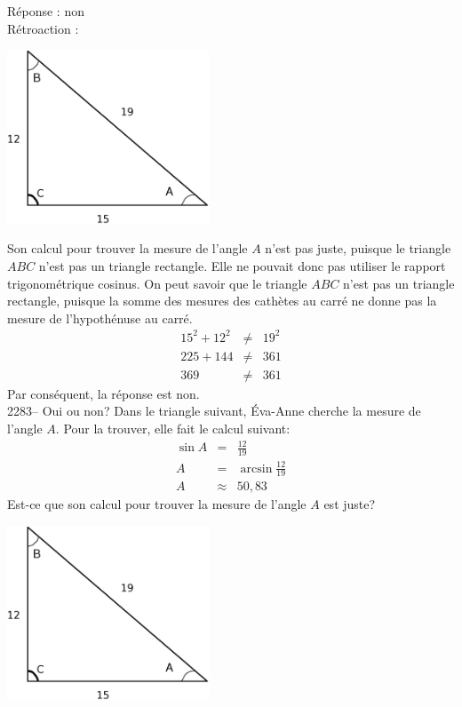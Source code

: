 \documentclass[letterpaper, 12pt]{article}
\begin{document}
R\'eponse : non\\

R\'etroaction :\\
\begin{center}
 \includegraphics[width=6cm,bb=14 14 607 535]{Triangle_rectangle2282.eps}
\end{center}
Son calcul pour trouver la mesure de l'angle $A$ n'est pas juste, puisque le triangle $ABC$ n'est pas un triangle rectangle. Elle ne pouvait donc pas utiliser le rapport trigonom\'etrique cosinus. On peut savoir que le triangle $ABC$ n'est pas un triangle rectangle, puisque la somme des mesures des cath\`etes au carr\'e ne donne pas la mesure de l'hypoth\'enuse au carr\'e.
\begin{eqnarray*}
15^{2}+12^{2}&\neq&19^{2}\\
225+144&\neq&361\\
369&\neq&361
\end{eqnarray*}
Par cons\'equent, la r\'eponse est non.\\

2283-- Oui ou non? Dans le triangle suivant, \'Eva-Anne cherche la mesure de l'angle $A$. Pour la trouver, elle fait le calcul suivant:
\begin{eqnarray*}
\sin{A}&=&\frac{12}{19}\\
A&=&\arcsin{\frac{12}{19}}\\
A&\approx&50,83
\end{eqnarray*}
Est-ce que son calcul pour trouver la mesure de l'angle $A$ est juste?\\
\begin{center}
 \includegraphics[width=6cm,bb=14 14 607 535]{Triangle_rectangle2282.eps}
\end{center}
\end{document}
